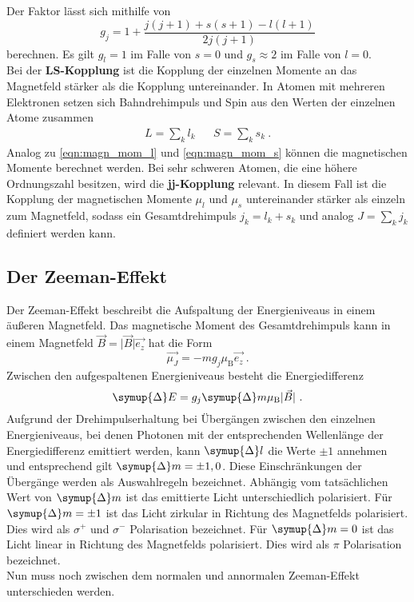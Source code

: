     Der Faktor lässt sich mithilfe von 
    \begin{equation}
        g_{j} = 1 + \frac{j(j+1) + s(s+1) - l(l+1)}{2j(j+1)}
        \label{eqn:lande}
    \end{equation}
    berechnen.
    Es gilt $g_l = 1$ im Falle von $s = 0$ und $g_s \approx 2$ im Falle von $l = 0$.\\
    Bei der \textbf{LS-Kopplung} ist die Kopplung der einzelnen Momente an das Magnetfeld stärker als die Kopplung untereinander.
    In Atomen mit mehreren Elektronen setzen sich Bahndrehimpuls und Spin aus den Werten der einzelnen Atome zusammen
    \begin{align}
        L = \sum_k l_k && S = \sum_k s_k \ .
    \end{align}
    Analog zu \autoref{eqn:magn_mom_l} und \autoref{eqn:magn_mom_s} können die magnetischen Momente berechnet werden.
    Bei sehr schweren Atomen,
    die eine höhere Ordnungszahl besitzen,
    wird die \textbf{jj-Kopplung} relevant.
    In diesem Fall ist die Kopplung der magnetischen Momente $\mu_l$ und $\mu_s$ untereinander stärker als einzeln zum Magnetfeld,
    sodass ein Gesamtdrehimpuls $j_k = l_k + s_k$ und analog $J = \sum_k j_k$ definiert werden kann.

\subsection{Der Zeeman-Effekt}

    Der Zeeman-Effekt beschreibt die Aufspaltung der Energieniveaus in einem äußeren Magnetfeld.
    Das magnetische Moment des Gesamtdrehimpuls kann in einem Magnetfeld $\vec{B} = \lvert \vec{B} \rvert \vec{e_z}$ hat die Form
    \begin{equation}
        \vec{\mu_J} = - m g_j \mu_\text{B} \vec{e_z} \ .
    \end{equation}
    Zwischen den aufgespaltenen Energieniveaus besteht die Energiedifferenz
    \begin{equation}
        \symup{\Delta} E = g_j \symup{\Delta} m \mu_\text{B} \lvert \vec{B} \rvert \ .
        \label{eqn:energiedifferenz}
    \end{equation}
    Aufgrund der Drehimpulserhaltung bei Übergängen zwischen den einzelnen Energieniveaus,
    bei denen Photonen mit der entsprechenden Wellenlänge der Energiedifferenz emittiert werden,
    kann $\symup{\Delta} l$ die Werte $\pm 1$ annehmen und entsprechend gilt $\symup{\Delta} m = \pm 1, 0$.
    Diese Einschränkungen der Übergänge werden als Auswahlregeln bezeichnet.
    Abhängig vom tatsächlichen Wert von $\symup{\Delta} m$ ist das emittierte Licht unterschiedlich polarisiert.
    Für $\symup{\Delta} m = \pm 1$ ist das Licht zirkular in Richtung des Magnetfelds polarisiert. 
    Dies wird als $\sigma^+$ und $\sigma^-$ Polarisation bezeichnet.
    Für $\symup{\Delta} m = 0$ ist das Licht linear in Richtung des Magnetfelds polarisiert. 
    Dies wird als $\pi$ Polarisation bezeichnet.\\
    Nun muss noch zwischen dem normalen und annormalen Zeeman-Effekt unterschieden werden.

